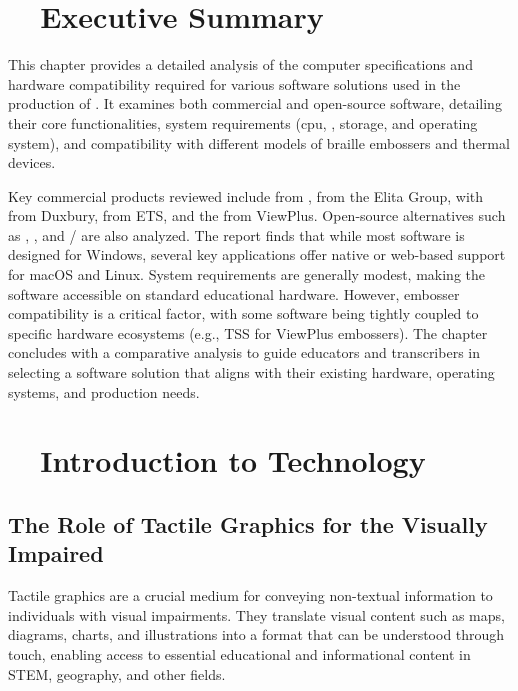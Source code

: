 \section{~~Executive Summary}\label{ch14:sec:executive-summary}
This chapter provides a detailed analysis of the computer specifications and hardware compatibility required for various software solutions used in the production of . It examines both commercial and open-source software, detailing their core functionalities, system requirements (\gls{cpu}, , storage, and operating system), and compatibility with different models of braille embossers and thermal devices.

Key commercial products reviewed include  from \supercite{TactileViewIrie},  from the Elita Group\supercite{ElitaElPicsPrint},  with  from Duxbury\supercite{DuxburyDBT},  from ETS, and the  from ViewPlus\supercite{ViewplusTSS}. Open-source alternatives such as \supercite{SoftorageInkscape}, \supercite{TouchMapper}, and /\supercite{aph-brailleblaster} are also analyzed. The report finds that while most software is designed for Windows, several key applications offer native or web-based support for macOS and Linux. System requirements are generally modest, making the software accessible on standard educational hardware. However, embosser compatibility is a critical factor, with some software being tightly coupled to specific hardware ecosystems (e.g., TSS for ViewPlus embossers\supercite{ViewPlusProduct}). The chapter concludes with a comparative analysis to guide educators and transcribers in selecting a software solution that aligns with their existing hardware, operating systems, and production needs.

\section{~~Introduction to  Technology}\label{ch14:sec:introduction}
\subsection{The Role of Tactile Graphics for the Visually Impaired}\label{ch14:ssec:role-of-tactile-graphics}
Tactile graphics are a crucial medium for conveying non-textual information to individuals with visual impairments\supercite{CreatingTactileGraphics, Wall2003}. They translate visual content such as maps, diagrams, charts, and illustrations into a format that can be understood through touch, enabling access to essential educational and informational content in STEM, geography, and other fields\supercite{AELData, GetBraille}.

